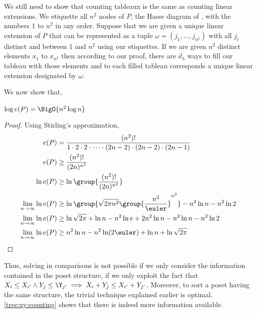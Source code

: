 We still need to show that counting tableaux is the same as counting linear
extensions. We etiquette all \( n^2 \) nodes of \(P\), the Hasse diagram of
\XY, with the numbers \(1\) to \( n^2 \) in any order. Suppose that we are
given a unique linear extension of \(P\) that can be represented as a tuple
\( \omega = ( j_1 , \ldots , j_{n^2}) \)
with all \( j_i \) distinct and between \(1\) and \( n^2 \) using our
etiquettes. If we are given \( n^2 \) distinct elements \( x_1 \) to
\( x_{n^2} \) then according to our proof, there are \( d_{\lambda} \) ways to
fill our tableau with those elements and to each filled tableau corresponds a
unique linear extension designated by \(\omega\).


We now show that,

\begin{theorem}
\( \log e(P) = \BigO{n^2 \log n} \)
\end{theorem}

\begin{proof}
Using Stirling's approximation,
\begin{align}
e(P) &= \frac{(n^2)!}{1 \cdot 2 \cdot 2 \cdot \cdots \cdot (2n-2) \cdot (2n-2) \cdot (2n-1)}\\
e(P) &\ge \frac{(n^2)!}{(2n)^{n^2}}\\
\ln e(P) &\ge \ln \group{\frac{(n^2)!}{(2n)^{n^2}}}\\
\lim_{n \to \infty} \ln e(P) &\ge \ln{\group{\sqrt{2 \pi n^2}
\group{\frac{n^2}{\euler}}^{n^2}}}  - n^2 \ln n - n^2 \ln 2\\
\lim_{n \to \infty} \ln e(P) &\ge \ln{\sqrt{2\pi}} + \ln n - n^2 \ln e + 2 n^2
\ln n - n^2 \ln n - n^2 \ln 2\\
\lim_{n \to \infty} \ln e(P) &\ge n^2 \ln n - n^2 \ln (2\euler) + \ln n + \ln \sqrt{2\pi}
\end{align}
\end{proof}

Thus, solving \XY in  comparisons is not possible if we only
consider the information contained in the poset structure, \ie if we only
exploit the fact that \( X_i \le X_{i'} \land Y_j \le \Y_{j'} \implies X_i +
Y_j \le X_{i'} + Y_{j'}\). Moreover, to sort a poset having the same structure,
the trivial \mergesort technique explained earlier is optimal.
\ref{tree:xy:counting} shows that there is indeed more information available.
